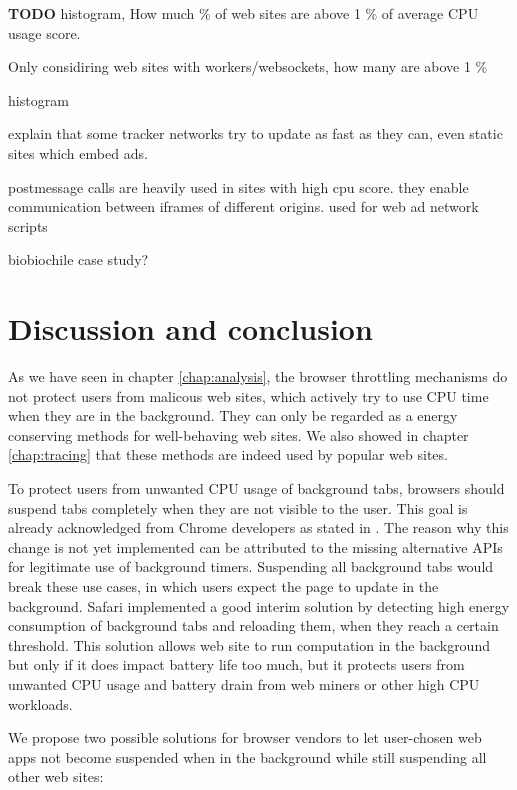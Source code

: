 \documentclass[
	ruledheaders=section,%
	class=report,%
	thesis={type=bachelor},%
	accentcolor=9c,%
	custommargins=true,%
	marginpar=false,%
	parskip=half-,%
	fontsize=11pt,%
]{tudapub}
\begin{document}
  \textbf{TODO} histogram, How much \% of web sites are above 1 \% of average CPU usage score.

  Only considiring web sites with workers/websockets, how many are above 1 \%

  histogram

  explain that some tracker networks try to update as fast as they can, even static sites which embed ads.

  postmessage calls are heavily used in sites with high cpu score. they enable communication between iframes of different origins. used for web ad network scripts

  biobiochile case study?
  
  
  
  \newpage
  \chapter{Discussion and conclusion}

  As we have seen in chapter \ref{chap:analysis}, the browser throttling mechanisms do not protect users from malicous web sites, which actively try to use CPU time when they are in the background. They can only be regarded as a energy conserving methods for well-behaving web sites. We also showed in chapter \ref{chap:tracing} that these methods are indeed used by popular web sites.

  To protect users from unwanted CPU usage of background tabs, browsers should suspend tabs completely when they are not visible to the user. This goal is already acknowledged from Chrome developers as stated in \cite{chrome-background-tabs-roadmap}. The reason why this change is not yet implemented can be attributed to the missing alternative APIs for legitimate use of background timers. Suspending all background tabs would break these use cases, in which users expect the page to update in the background. Safari implemented a good interim solution by detecting high energy consumption of background tabs and reloading them, when they reach a certain threshold. This solution allows web site to run computation in the background but only if it does impact battery life too much, but it protects users from unwanted CPU usage and battery drain from web miners or other high CPU workloads.

  We propose two possible solutions for browser vendors to let user-chosen web apps not become suspended when in the background while still suspending all other web sites:
\end{document}
